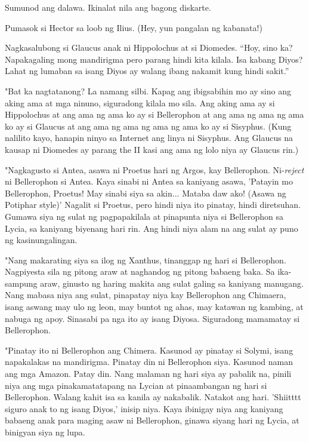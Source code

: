 \documentclass[12pt,letterpaper]{report}
\begin{document}
Sumunod ang dalawa. Ikinalat nila ang bagong diskarte.

Pumasok si Hector sa loob ng Ilius. (Hey, yun pangalan ng kabanata!)

Nagkasalubong si Glaucus anak ni Hippolochus at si Diomedes. ``Hoy, sino ka? Napakagaling mong mandirigma pero parang hindi kita kilala. Isa kabang Diyos? Lahat ng lumaban sa isang Diyos ay walang ibang nakamit kung hindi sakit.''

"Bat ka nagtatanong? La namang silbi. Kapag ang ibigsabihin mo ay sino ang aking ama at mga ninuno, siguradong kilala mo sila. Ang aking ama ay si Hippolochus at ang ama ng ama ko ay si Bellerophon at ang ama ng ama ng ama ko ay si Glaucus at ang ama ng ama ng ama ng ama ko ay si Sisyphus. (Kung nalilito kayo, hanapin ninyo sa Internet ang linya ni Sisyphus. Ang Glaucus na kausap ni Diomedes ay parang the II kasi ang ama ng lolo niya ay Glaucus rin.)

"Nagkagusto si Antea, asawa ni Proetus hari ng Argos, kay Bellerophon. Ni-\textit{reject} ni Bellerophon si Antea. Kaya sinabi ni Antea sa kaniyang asawa, 'Patayin mo Bellerophon, Proetus! May sinabi siya sa akin...  Mataba daw ako! (Asawa ng Potiphar style)' Nagalit si Proetus, pero hindi niya ito pinatay, hindi diretsuhan. Gumawa siya ng sulat ng pagpapakilala at pinapunta niya si Bellerophon sa Lycia, sa kaniyang biyenang hari rin. Ang hindi niya alam na ang sulat ay puno ng kasinungalingan.

"Nang makarating siya sa ilog ng Xanthus, tinanggap ng hari si Bellerophon. Nagpiyesta sila ng pitong araw at naghandog ng pitong babaeng baka. Sa ika-sampung araw, ginusto ng haring makita ang sulat galing sa kaniyang manugang. Nang mabasa niya ang sulat, pinapatay niya kay Bellerophon ang Chimaera, isang aswang may ulo ng leon, may buntot ng ahas, may katawan ng kambing, at nabuga ng apoy. Sinasabi pa nga ito ay isang Diyosa. Siguradong mamamatay si Bellerophon.

"Pinatay ito ni Bellerophon ang Chimera. Kasunod ay pinatay si Solymi, isang napakalakas na mandirigma. Pinatay din ni Bellerophon siya. Kasunod naman ang mga Amazon. Patay din. Nang malaman ng hari siya ay pabalik na, pinili niya ang mga pinakamatatapang na Lycian at pinaambangan ng hari si Bellerophon. Walang kahit isa sa kanila ay nakabalik. Natakot ang hari. 'Shiitttt siguro anak to ng isang Diyos,' inisip niya. Kaya ibinigay niya ang kaniyang babaeng anak para maging asaw ni Bellerophon, ginawa siyang hari ng Lycia, at binigyan siya ng lupa.
\end{document}
